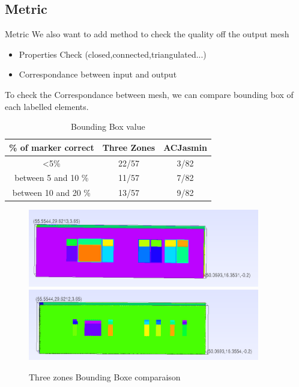 \documentclass[10pt]{beamer}
\begin{document}
\subsection{Metric}
\begin{frame}{Metric}
We also want to add method to check the quality off the output mesh
\begin{itemize}
    \item Properties Check (closed,connected,triangulated...)
    \item Correspondance between input and output
\end{itemize}
To check the Correspondance between mesh, we can compare 
bounding box of each labelled elements.

\begin{table}[h]
    \centering
    \caption{Bounding Box value}
    \begin{tabular}{|c|c|c|}
        \hline
         \% of marker correct & Three Zones & ACJasmin \\
        \hline
        <5\% & 22/57 & 3/82 \\
        between 5 and 10 \% & 11/57 & 7/82 \\
        between 10 and 20 \% & 13/57  & 9/82 \\
        \hline
    \end{tabular}
\end{table}
\end{frame}

\begin{frame}
    
    \begin{figure}
    \includegraphics[width=0.9\textwidth]{../image/3_zones_input_bounding_box.png}
    \includegraphics[width=0.9\textwidth]{../image/3zone_output_bounding_box.png}
    \caption{Three zones Bounding Boxe comparaison}
    \end{figure}
    
\end{frame}
\end{document}
